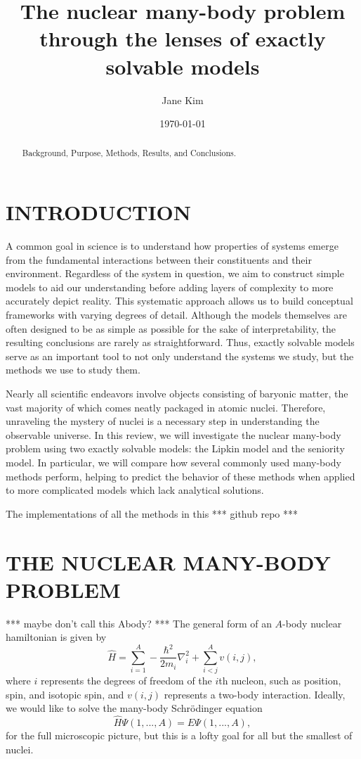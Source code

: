 \documentclass[prb,aps,twocolumn,showpacs,10pt]{revtex4-2}
\begin{document}
\title {The nuclear many-body problem through the lenses of exactly solvable models}
\author{Jane Kim}
\date{\today}
\begin{abstract}

Background, Purpose, Methods, Results, and Conclusions. 
\end{abstract}
\maketitle


\section{INTRODUCTION}

A common goal in science is to understand how properties of systems emerge from the fundamental interactions between their constituents and their environment. Regardless of the system in question, we aim to construct simple models to aid our understanding before adding layers of complexity to more accurately depict reality. This systematic approach allows us to build conceptual frameworks with varying degrees of detail. Although the models themselves are often designed to be as simple as possible for the sake of interpretability, the resulting conclusions are rarely as straightforward. Thus, exactly solvable models serve as an important tool to not only understand the systems we study, but the methods we use to study them.


Nearly all scientific endeavors involve objects consisting of baryonic matter, the vast majority of which comes neatly packaged in atomic nuclei. Therefore, unraveling the mystery of nuclei is a necessary step in understanding the observable universe. In this review, we will investigate the nuclear many-body problem using two exactly solvable models: the Lipkin model and the seniority model. In particular, we will compare how several commonly used many-body methods perform, helping to predict the behavior of these methods when applied to more complicated models which lack analytical solutions. 


The implementations of all the methods in this 
*** github repo ***

\section{THE NUCLEAR MANY-BODY PROBLEM}

*** maybe don't call this Abody? ***
The general form of an $A$-body nuclear hamiltonian is given by
\begin{equation}
\hat{H} = \sum_{i=1}^A -\frac{\hbar^2}{2m_i} \nabla_i^2 + \sum_{i<j}^A v(i,j),
\end{equation}
where $i$ represents the degrees of freedom of the $i$th nucleon, such as position, spin, and isotopic spin, and $v(i,j)$ represents a two-body interaction. Ideally, we would like to solve the many-body Schr\"odinger equation
\begin{equation}
\hat{H} \Psi(1,...,A) = E \Psi(1,...,A),
\end{equation}
for the full microscopic picture, but this is a lofty goal for all but the smallest of nuclei. 
\end{document}
